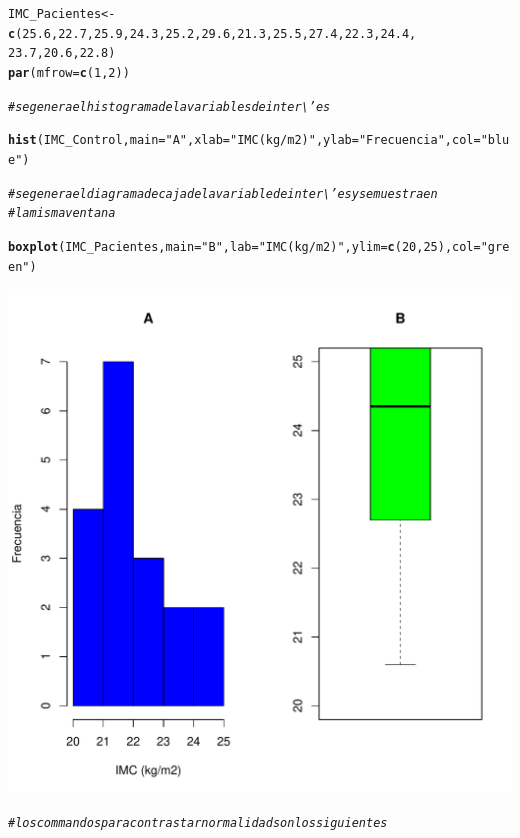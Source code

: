 \documentclass[12pt,letterpaper]{article}\usepackage[]{graphicx}\usepackage[]{color}
\makeatletter
\def\maxwidth{ %
  \ifdim\Gin@nat@width>\linewidth
    \linewidth
  \else
    \Gin@nat@width
  \fi
}
\newcommand{\hlnum}[1]{\textcolor[rgb]{0.686,0.059,0.569}{#1}}%
\newcommand{\hlstr}[1]{\textcolor[rgb]{0.192,0.494,0.8}{#1}}%
\newcommand{\hlcom}[1]{\textcolor[rgb]{0.678,0.584,0.686}{\textit{#1}}}%
\newcommand{\hlstd}[1]{\textcolor[rgb]{0.345,0.345,0.345}{#1}}%
\newcommand{\hlkwb}[1]{\textcolor[rgb]{0.69,0.353,0.396}{#1}}%
\newcommand{\hlkwc}[1]{\textcolor[rgb]{0.333,0.667,0.333}{#1}}%
\newcommand{\hlkwd}[1]{\textcolor[rgb]{0.737,0.353,0.396}{\textbf{#1}}}%
\newenvironment{kframe}{%
 \def\at@end@of@kframe{}%
 \ifinner\ifhmode%
  \def\at@end@of@kframe{\end{minipage}}%
  \begin{minipage}{\columnwidth}%
 \fi\fi%
 \def\FrameCommand##1{\hskip\@totalleftmargin \hskip-\fboxsep
 \colorbox{shadecolor}{##1}\hskip-\fboxsep
     \hskip-\linewidth \hskip-\@totalleftmargin \hskip\columnwidth}%
 \MakeFramed {\advance\hsize-\width
   \@totalleftmargin\z@ \linewidth\hsize
   \@setminipage}}%
 {\par\unskip\endMakeFramed%
 \at@end@of@kframe}
\newenvironment{knitrout}{}{} %
\makeatother
\begin{document}
\begin{knitrout}
\color{fgcolor}\begin{kframe}
\begin{alltt}
\hlstd{IMC_Pacientes} \hlkwb{<-} \hlkwd{c}\hlstd{(}\hlnum{25.6}\hlstd{,} \hlnum{22.7}\hlstd{,} \hlnum{25.9}\hlstd{,} \hlnum{24.3}\hlstd{,} \hlnum{25.2}\hlstd{,} \hlnum{29.6}\hlstd{,} \hlnum{21.3}\hlstd{,} \hlnum{25.5}\hlstd{,} \hlnum{27.4}\hlstd{,} \hlnum{22.3}\hlstd{,} \hlnum{24.4}\hlstd{,}
                   \hlnum{23.7}\hlstd{,} \hlnum{20.6}\hlstd{,} \hlnum{22.8}\hlstd{)}
\hlkwd{par}\hlstd{(}\hlkwc{mfrow}\hlstd{=}\hlkwd{c}\hlstd{(}\hlnum{1}\hlstd{,}\hlnum{2}\hlstd{))}

\hlcom{#se genera el histograma de la variables de inter\textbackslash{}'es }

\hlkwd{hist}\hlstd{(IMC_Control,}\hlkwc{main}\hlstd{=}\hlstr{"A"}\hlstd{,}\hlkwc{xlab}\hlstd{=}\hlstr{"IMC (kg/m2)"}\hlstd{,}\hlkwc{ylab}\hlstd{=}\hlstr{"Frecuencia"}\hlstd{,}\hlkwc{col}\hlstd{=}\hlstr{"blue"}\hlstd{)}

\hlcom{# se genera el diagrama de caja de la variable de inter\textbackslash{}'es y se muestra en }
\hlcom{# la misma ventana }

\hlkwd{boxplot}\hlstd{(IMC_Pacientes,}\hlkwc{main}\hlstd{=}\hlstr{"B"}\hlstd{,} \hlkwc{lab}\hlstd{=}\hlstr{"IMC (kg/m2)"}\hlstd{,}\hlkwc{ylim}\hlstd{=}\hlkwd{c}\hlstd{(}\hlnum{20}\hlstd{,}\hlnum{25}\hlstd{),} \hlkwc{col}\hlstd{=}\hlstr{"green"}\hlstd{)}
\end{alltt}
\end{kframe}
\includegraphics[width=\maxwidth]{figure/unnamed-chunk-4-1} 
\begin{kframe}\begin{alltt}
\hlcom{# los commandos para contrastar normalidad son los siguientes }


\end{alltt}
\end{kframe}
\end{knitrout}
\end{document}
